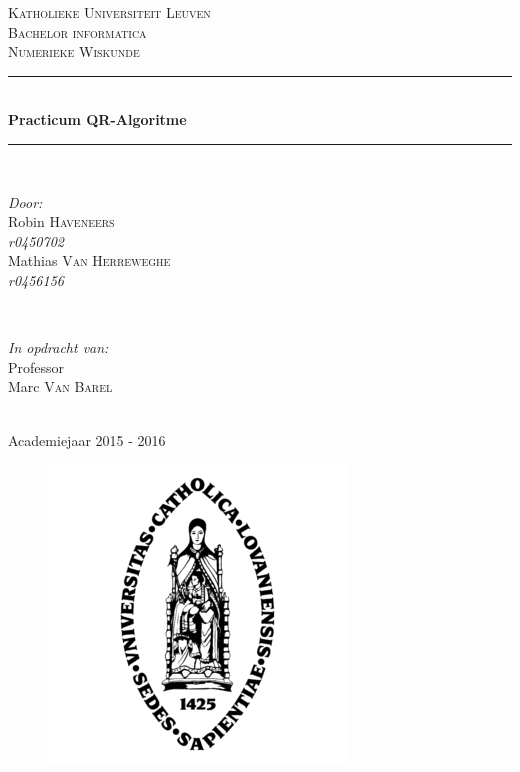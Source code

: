 \documentclass{article}
\begin{document}
\begin{titlepage}
	
	\newcommand{\HRule}{\rule{\linewidth}{0.5mm}}
	
	\center
	
	\textsc{\LARGE Katholieke Universiteit Leuven}\\[1.5cm]
	\textsc{\Large Bachelor informatica}\\[0.5cm]
	\textsc{\large Numerieke Wiskunde}\\[0.5cm]
	
	\HRule \\[0.4cm]
	{ \huge \bfseries Practicum QR-Algoritme }\\[0.4cm]
	\HRule \\[1.5cm]
	\begin{minipage}
		{0.4
		\textwidth} 
		\begin{flushleft}
			\large \emph{Door:}\\
			Robin \textsc{Haveneers} \\
			\emph{r0450702}\\
			Mathias \textsc{Van Herreweghe} \\
			\emph{r0456156}
		\end{flushleft}
	\end{minipage}
	~ 
	\begin{minipage}
		{0.4
		\textwidth} 
		\begin{flushright}
			\large \emph{In opdracht van:} \\
			Professor \\
			Marc \textsc{Van Barel} 
		\end{flushright}
	\end{minipage}
	\\[4cm]
	
	{\large Academiejaar 2015 - 2016}\\
	\begin{figure}
		[b] \centering 
		\includegraphics[scale = 0.2]{kul.png} 
	\end{figure}
\end{titlepage}
\end{document}

